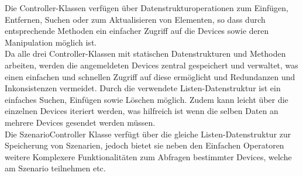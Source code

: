 Die Controller-Klassen verfügen über Datenstrukturoperationen zum Einfügen, Entfernen, Suchen oder zum Aktualisieren von Elementen,
so dass durch entsprechende Methoden ein einfacher Zugriff auf die Devices sowie deren Manipulation möglich ist. \\
Da alle drei Controller-Klassen mit statischen Datenstrukturen und Methoden arbeiten, werden die angemeldeten Devices zentral 
gespeichert und verwaltet, was einen einfachen und schnellen Zugriff auf diese ermöglicht und Redundanzen und Inkonsistenzen vermeidet.
Durch die verwendete Listen-Datenstruktur ist ein einfaches Suchen, Einfügen sowie Löschen möglich. Zudem kann leicht über die 
einzelnen Devices iteriert werden, was hilfreich ist wenn die selben Daten an mehrere Devices gesendet werden müssen.
\\
Die SzenarioController Klasse verfügt über die gleiche Listen-Datenstruktur zur Speicherung von Szenarien, jedoch bietet sie neben
den Einfachen Operatoren weitere Komplexere Funktionalitäten zum Abfragen bestimmter Devices, welche am Szenario teilnehmen etc. 
